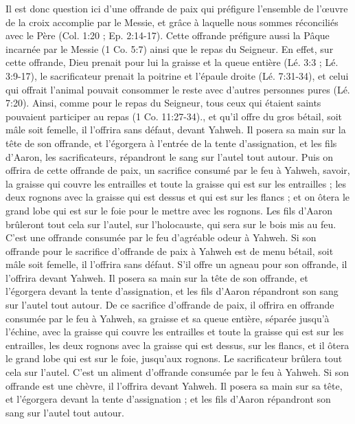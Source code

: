 \begin{multicols}{2}
{Il est donc question ici d'une offrande de paix qui préfigure l'ensemble de l'œuvre de la croix accomplie par le Messie, et grâce à laquelle nous sommes réconciliés avec le Père (Col. 1:20 ; Ep. 2:14-17). Cette offrande préfigure aussi la Pâque incarnée par le Messie (1 Co. 5:7) ainsi que le repas du Seigneur. En effet, sur cette offrande, Dieu prenait pour lui la graisse et la queue entière (Lé. 3:3 ; Lé. 3:9-17), le sacrificateur prenait la poitrine et l'épaule droite (Lé. 7:31-34), et celui qui offrait l'animal pouvait consommer le reste avec d'autres personnes pures (Lé. 7:20). Ainsi, comme pour le repas du Seigneur, tous ceux qui étaient saints pouvaient participer au repas (1 Co. 11:27-34).}, et qu'il offre du gros bétail, soit mâle soit femelle, il l'offrira sans défaut, devant Yahweh.
Il posera sa main sur la tête de son offrande, et l'égorgera à l'entrée de la tente d'assignation, et les fils d'Aaron, les sacrificateurs, répandront le sang sur l'autel tout autour.
Puis on offrira de cette offrande de paix, un sacrifice consumé par le feu à Yahweh, savoir, la graisse qui couvre les entrailles et toute la graisse qui est sur les entrailles ;
les deux rognons avec la graisse qui est dessus et qui est sur les flancs ; et on ôtera le grand lobe qui est sur le foie pour le mettre avec les rognons.
Les fils d'Aaron brûleront tout cela sur l'autel, sur l'holocauste, qui sera sur le bois mis au feu. C'est une offrande consumée par le feu d'agréable odeur à Yahweh.
Si son offrande pour le sacrifice d'offrande de paix à Yahweh est de menu bétail, soit mâle soit femelle, il l'offrira sans défaut.
S'il offre un agneau pour son offrande, il l'offrira devant Yahweh.
Il posera sa main sur la tête de son offrande, et l'égorgera devant la tente d'assignation, et les fils d'Aaron répandront son sang sur l'autel tout autour.
De ce sacrifice d'offrande de paix, il offrira en offrande consumée par le feu à Yahweh, sa graisse et sa queue entière, séparée jusqu'à l'échine, avec la graisse qui couvre les entrailles et toute la graisse qui est sur les entrailles,
les deux rognons avec la graisse qui est dessus, sur les flancs, et il ôtera le grand lobe qui est sur le foie, jusqu'aux rognons.
Le sacrificateur brûlera tout cela sur l'autel. C'est un aliment d'offrande consumée par le feu à Yahweh.
Si son offrande est une chèvre, il l'offrira devant Yahweh.
Il posera sa main sur sa tête, et l'égorgera devant la tente d'assignation ; et les fils d'Aaron répandront son sang sur l'autel tout autour.

\end{multicols}
